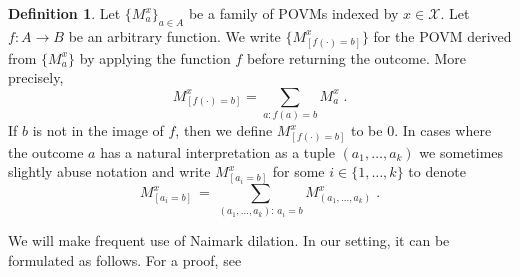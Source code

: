 \documentclass[11pt]{article}
\theoremstyle{definition}
\newtheorem{definition}[theorem]{Definition}
\renewcommand{\cal}[1]{\mathcal{#1}}
\begin{document}
\begin{definition}
  \label{def:bracket}
  Let $\{M^x_a\}_{a\in A}$ be a family of POVMs indexed by $x\in \cal{X}$.
  Let $f:A\to B$ be an arbitrary function.
  We write $\bigl\{ M^x_{[f(\cdot)=b]} \bigr\}$ for the POVM derived from
  $\{M^x_a\}$ by applying the function $f$ before returning the outcome.
  More precisely,
\begin{equation*}
  M^x_{[f(\cdot) = b]} = \sum_{a : f(a)=b} M^x_a\;.
\end{equation*}
If $b$ is not in the image of $f$, then we define $M^x_{[f(\cdot) = b]}$ to be
$0$. In cases where the outcome $a$ has a natural interpretation as a tuple $(a_1,\ldots,a_k)$ we sometimes slightly abuse notation and write $M^x_{[a_i=b]}$ for some $i\in \{1,\ldots,k\}$ to denote 
\[ M^x_{[a_i=b]} \,=\,\sum_{(a_1,\ldots,a_k):\,a_i=b} M^x_{(a_1,\ldots,a_k)}\;.\]
\end{definition}

We will make frequent use of Naimark dilation. In our setting, it can be formulated as follows. For a proof, see~\cite[Theorem 5.1]{ML20}
\end{document}
